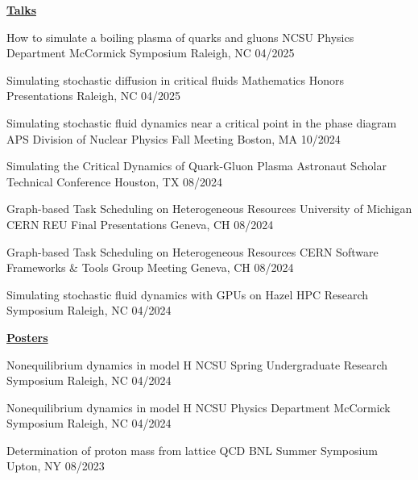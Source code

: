 {\large \bfseries \underline{Talks}}
\vspace{0.3em}

\presentation
{How to simulate a boiling plasma of quarks and gluons}
{NCSU Physics Department McCormick Symposium}
{Raleigh, NC} {04/2025}

\presentation
{Simulating stochastic diffusion in critical fluids}
{Mathematics Honors Presentations}
{Raleigh, NC} {04/2025}

\presentation
{Simulating stochastic fluid dynamics near a critical point in the phase diagram}
{APS Division of Nuclear Physics Fall Meeting}
{Boston, MA} {10/2024}

\presentation
{Simulating the Critical Dynamics of Quark-Gluon Plasma}
{Astronaut Scholar Technical Conference}
{Houston, TX} {08/2024}

\presentation
{Graph-based Task Scheduling on Heterogeneous Resources}
{University of Michigan CERN REU Final Presentations}
{Geneva, CH} {08/2024}

\presentation
{Graph-based Task Scheduling on Heterogeneous Resources}
{CERN Software Frameworks \& Tools Group Meeting}
{Geneva, CH} {08/2024}

\presentation
{Simulating stochastic fluid dynamics with GPUs on Hazel}
{HPC Research Symposium}
{Raleigh, NC} {04/2024}

{\large \bfseries \underline{Posters}}
\vspace{0.3em}

\presentation
{Nonequilibrium dynamics in model H}
{NCSU Spring Undergraduate Research Symposium}
{Raleigh, NC} {04/2024}

\presentation
{Nonequilibrium dynamics in model H}
{NCSU Physics Department McCormick Symposium}
{Raleigh, NC} {04/2024}

\presentation
{Determination of proton mass from lattice QCD}
{BNL Summer Symposium}
{Upton, NY} {08/2023}
